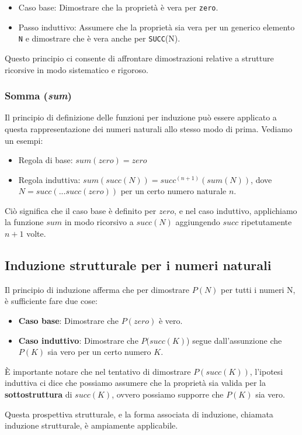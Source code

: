\begin{itemize}
  \item Caso base: Dimostrare che la proprietà è vera per \texttt{zero}.
  \item Passo induttivo: Assumere che la proprietà sia vera per un generico elemento \texttt{N} e dimostrare che è
  vera anche per \texttt{SUCC}(N).
\end{itemize}

Questo principio ci consente di affrontare dimostrazioni relative a strutture ricorsive in modo sistematico e rigoroso.

\subsubsection{Somma (\textit{sum})}
Il principio di definizione delle funzioni per induzione può essere applicato a questa rappresentazione dei numeri naturali allo stesso modo di prima. Vediamo un esempi:

\begin{itemize}
   \item Regola di base: $sum(zero) = zero$
   \item Regola induttiva: $sum(succ(N)) = succ^{(n+1)}(sum(N))$, dove $N = succ(...succ(zero))$ per un certo numero naturale $n$.
\end{itemize}

Ciò significa che il caso base è definito per $zero$, e nel caso induttivo, applichiamo la funzione $sum$ in modo ricorsivo a $succ(N)$ aggiungendo $succ$ ripetutamente $n+1$ volte.
\subsection{Induzione strutturale per i numeri naturali}
Il principio di induzione afferma che per dimostrare $P(N)$ per tutti i numeri N, è sufficiente fare due cose:
\begin{itemize}
  \item \textbf{Caso base}: Dimostrare che $P(zero)$ è vero.
  \item \textbf{Caso induttivo}: Dimostrare che $P(succ(K)$) segue dall'assunzione che $P(K)$ sia vero per un certo numero $K$.
\end{itemize}
È importante notare che nel tentativo di dimostrare $P(succ(K))$, l'ipotesi induttiva ci dice che possiamo assumere che
la proprietà sia valida per la \textbf{sottostruttura} di $succ(K)$, ovvero possiamo supporre che $P(K)$ sia vero.

Questa prospettiva strutturale, e la forma associata di induzione, chiamata induzione strutturale, è ampiamente applicabile.


